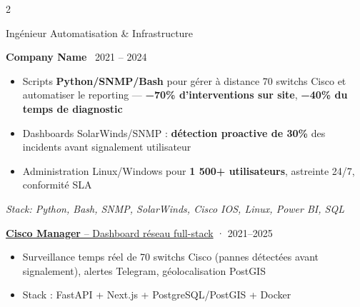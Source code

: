 \documentclass[7pt,a4paper,withhyper]{altacv}
\renewcommand{\cvevent}[4]{%
  {\large\color{emphasis}\raggedright #1\par}
  \smallskip\normalsize
  \ifstrequal{#2}{}{}{%
    \textbf{\color{accent}#2}%
  }%
  \ifstrequal{#4}{}{}{%
    \ifstrequal{#2}{}{}{\hspace{1.5em}}%
    {\small\cvLocationMarker~#4}%
  }%
  \ifstrequal{#3}{}{}{%
    \hfill{\small\cvDateMarker~#3}%
  }\par
}
\providecommand{\cvgithub}{github-username}
\begin{document}
\begin{paracol}{2}
\vspace{0.25em}\par\vspace{0.25em}

\cvevent{Ingénieur Automatisation \& Infrastructure}{Company Name}{2021 – 2024}{}
\smallskip
\begin{itemize}[leftmargin=1.25em, itemsep=0pt, parsep=0pt]
\item \justifying Scripts \textbf{Python/SNMP/Bash} pour gérer à distance 70 switchs Cisco et automatiser le reporting — \textbf{−70\% d'interventions sur site}, \textbf{−40\% du temps de diagnostic}
\item \justifying Dashboards SolarWinds/SNMP : \textbf{détection proactive de 30\%} des incidents avant signalement utilisateur
\item \justifying Administration Linux/Windows pour \textbf{1 500+ utilisateurs}, astreinte 24/7, conformité SLA
\end{itemize}
\smallskip\noindent\textit{Stack: Python, Bash, SNMP, SolarWinds, Cisco IOS, Linux, Power BI, SQL}\par

\vspace{-0.5ex}

{\large\color{emphasis}\raggedright\href{https://github.com/\cvgithub/cisco-manager}{\textbf{Cisco Manager} -- Dashboard réseau full-stack} {\small\color{LightGrey}· 2021–2025}\par}
\vspace{0.1em}
\begin{itemize}[leftmargin=1.25em, nosep]
\item \justifying Surveillance temps réel de 70 switchs Cisco (pannes détectées avant signalement), alertes Telegram, géolocalisation PostGIS
\item \justifying Stack : FastAPI + Next.js + PostgreSQL/PostGIS + Docker
\end{itemize}\par
\vspace{0.1em}\par\vspace{0.1em}


\end{paracol}
\end{document}
